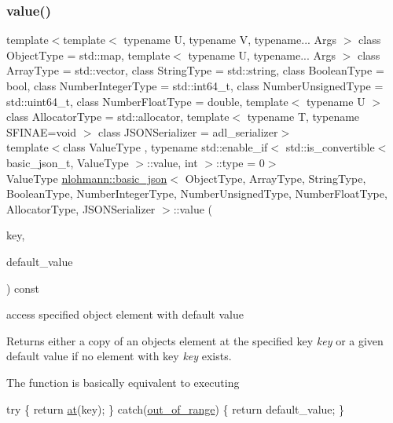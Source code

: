 \subsubsection{\texorpdfstring{value()}{value()}\hspace{0.1cm}{\footnotesize\ttfamily [1/4]}}
{\footnotesize\ttfamily template$<$template$<$ typename U, typename V, typename... Args $>$ class Object\+Type = std\+::map, template$<$ typename U, typename... Args $>$ class Array\+Type = std\+::vector, class String\+Type  = std\+::string, class Boolean\+Type  = bool, class Number\+Integer\+Type  = std\+::int64\+\_\+t, class Number\+Unsigned\+Type  = std\+::uint64\+\_\+t, class Number\+Float\+Type  = double, template$<$ typename U $>$ class Allocator\+Type = std\+::allocator, template$<$ typename T, typename S\+F\+I\+N\+A\+E=void $>$ class J\+S\+O\+N\+Serializer = adl\+\_\+serializer$>$ \\
template$<$class Value\+Type , typename std\+::enable\+\_\+if$<$ std\+::is\+\_\+convertible$<$ basic\+\_\+json\+\_\+t, Value\+Type $>$\+::value, int $>$\+::type  = 0$>$ \\
Value\+Type \mbox{\hyperlink{classnlohmann_1_1basic__json}{nlohmann\+::basic\+\_\+json}}$<$ Object\+Type, Array\+Type, String\+Type, Boolean\+Type, Number\+Integer\+Type, Number\+Unsigned\+Type, Number\+Float\+Type, Allocator\+Type, J\+S\+O\+N\+Serializer $>$\+::value (\begin{DoxyParamCaption}\item[{const typename object\+\_\+t\+::key\+\_\+type \&}]{key,  }\item[{const Value\+Type \&}]{default\+\_\+value }\end{DoxyParamCaption}) const\hspace{0.3cm}{\ttfamily [inline]}}



access specified object element with default value 

Returns either a copy of an object\textquotesingle{}s element at the specified key {\itshape key} or a given default value if no element with key {\itshape key} exists.

The function is basically equivalent to executing 
\begin{DoxyCode}
\textcolor{keywordflow}{try} \{
    \textcolor{keywordflow}{return} \mbox{\hyperlink{classnlohmann_1_1basic__json_a73ae333487310e3302135189ce8ff5d8}{at}}(key);
\} \textcolor{keywordflow}{catch}(\mbox{\hyperlink{classnlohmann_1_1basic__json_a28f7c2f087274a0012eb7a2333ee1580}{out\_of\_range}}) \{
    \textcolor{keywordflow}{return} default\_value;
\}
\end{DoxyCode}


